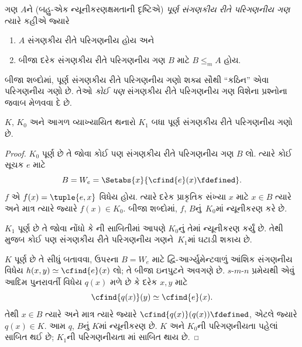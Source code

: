 \documentclass[../../../include/open-logic-section]{subfiles}
\begin{document}

\begin{defn}
ગણ $A$ને (બહુ-એક ન્યૂનીકરણક્ષમતાની દૃષ્ટિએ)
\emph{પૂર્ણ સંગણકીય રીતે પરિગણનીય ગણ} ત્યારે કહીએ જ્યારે
\begin{enumerate}
\item $A$ સંગણકીય રીતે પરિગણનીય હોય અને
\item બીજા દરેક સંગણકીય રીતે પરિગણનીય ગણ $B$ માટે $B \leq_m A$ હોય.
\end{enumerate}
\end{defn}

બીજા શબ્દોમાં, પૂર્ણ સંગણકીય રીતે પરિગણનીય ગણો શક્ય
સૌથી ``કઠિન'' એવા પરિગણનીય ગણો છે. તેઓ \emph{કોઈ પણ}
સંગણકીય રીતે પરિગણનીય ગણ વિશેના પ્રશ્નોના જવાબ મેળવવા દે છે.

\begin{thm}
$K$, $K_0$ અને આગળ વ્યાખ્યાયિત થનારો $K_1$ બધા પૂર્ણ
સંગણકીય રીતે પરિગણનીય ગણો છે.
\end{thm}

\begin{proof}
$K_0$ પૂર્ણ છે તે જોવા કોઈ પણ સંગણકીય રીતે પરિગણનીય ગણ
$B$ લો. ત્યારે કોઈ સૂચક $e$ માટે
\[
B = W_e = \Setabs{x}{\cfind{e}(x) \fdefined}.
\]
$f$ એ $f(x) = \tuple{e, x}$ વિધેય હોય. ત્યારે દરેક પ્રાકૃતિક
સંખ્યા $x$ માટે $x \in B$ ત્યારે અને માત્ર ત્યારે જ્યારે
$f(x) \in K_0$. બીજા શબ્દોમાં, $f$, $B$નું~$K_0$માં
ન્યૂનીકરણ કરે છે.

$K_1$ પૂર્ણ છે તે જોવા નોંધો કે ની
સાબિતીમાં આપણે $K_0$નું તેમાં ન્યૂનીકરણ કર્યું છે. તેથી
 મુજબ કોઈ પણ સંગણકીય રીતે
પરિગણનીય ગણને~$K_1$માં ઘટાડી શકાય છે.

$K$ પૂર્ણ છે તે સીધું બતાવવા, ઉપરના $B=W_e$ માટે
દ્વિ-આર્ગ્યુમેન્ટવાળું આંશિક સંગણનીય વિધેય
$h(x,y)\simeq\cfind{e}(x)$ લો; તે બીજા ઇનપુટને અવગણે છે.
$s$-$m$-$n$ પ્રમેયથી એવું આદિમ પુનરાવર્તી વિધેય $q(x)$
મળે છે કે દરેક $x,y$ માટે
\[
\cfind{q(x)}(y)\simeq\cfind{e}(x).
\]
તેથી $x\in B$ ત્યારે અને માત્ર ત્યારે જ્યારે
$\cfind{q(x)}(q(x))\fdefined$, એટલે જ્યારે $q(x)\in K$.
આમ $q$, $B$નું $K$માં ન્યૂનીકરણ છે. $K$ અને $K_0$ની
પરિગણનીયતા પહેલાં સાબિત થઈ છે; $K_1$ની પરિગણનીયતા
માં સાબિત થાય છે.
\end{proof}
\end{document}
